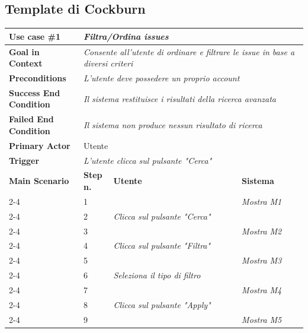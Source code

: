 \newpage
\subsection{Template di Cockburn}

\begin{center}
    \vspace*{-1em}
    \renewcommand{\arraystretch}{2.0}
    \begin{tabular}{|p{0.25\linewidth}|p{0.10\linewidth}|p{0.43\linewidth}|p{0.22\linewidth}|}
        \hline
        \textbf{Use case \#1} & \multicolumn{3}{l|}{\emph{Filtra/Ordina issues}} \\
        \hline
        \textbf{Goal in Context} & \multicolumn{3}{p{0.71\linewidth}|}{\emph{Consente all'utente di ordinare e filtrare le issue in base a diversi criteri}} \\
        \hline
        \textbf{Preconditions} & \multicolumn{3}{p{0.71\linewidth}|}{\emph{L'utente deve possedere un proprio account}} \\
        \hline
        \textbf{Success End Condition} & \multicolumn{3}{p{0.71\linewidth}|}{\emph{Il sistema restituisce i risultati della ricerca avanzata}} \\
        \hline
        \textbf{Failed End Condition} & \multicolumn{3}{p{0.71\linewidth}|}{\emph{Il sistema non produce nessun risultato di ricerca}} \\
        \hline
        \textbf{Primary Actor} & \multicolumn{3}{l|}{Utente} \\
        \hline
        \textbf{Trigger} & \multicolumn{3}{p{0.71\linewidth}|}{\emph{L'utente clicca sul pulsante "Cerca"}} \\
        \hline
        \textbf{Main Scenario} & \textbf{Step n.} & \textbf{Utente} & \textbf{Sistema} \\
        \cline{2-4}
        & 1 & & \emph{Mostra M1} \\
        \cline{2-4}
        & 2 & \emph{Clicca sul pulsante "Cerca"} & \\
        \cline{2-4}
        & 3 & & \emph{Mostra M2} \\
        \cline{2-4}
        & 4 & \emph{Clicca sul pulsante "Filtra"} & \\
        \cline{2-4}
        & 5 & & \emph{Mostra M3} \\
        \cline{2-4}
        & 6 & \emph{Seleziona il tipo di filtro} & \\
        \cline{2-4}
        & 7 & & \emph{Mostra M4} \\
        \cline{2-4}
        & 8 & \emph{Clicca sul pulsante "Apply"} & \\
        \cline{2-4}
        & 9 & & \emph{Mostra M5} \\
        \hline
    \end{tabular}
\end{center}

